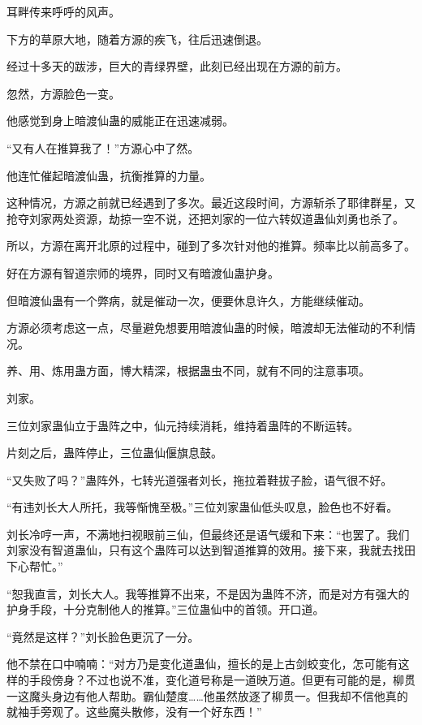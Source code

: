 
\begin{this_body}

耳畔传来呼呼的风声。

下方的草原大地，随着方源的疾飞，往后迅速倒退。

经过十多天的跋涉，巨大的青绿界壁，此刻已经出现在方源的前方。

忽然，方源脸色一变。

他感觉到身上暗渡仙蛊的威能正在迅速减弱。

“又有人在推算我了！”方源心中了然。

他连忙催起暗渡仙蛊，抗衡推算的力量。

这种情况，方源之前就已经遇到了多次。最近这段时间，方源斩杀了耶律群星，又抢夺刘家两处资源，劫掠一空不说，还把刘家的一位六转奴道蛊仙刘勇也杀了。

所以，方源在离开北原的过程中，碰到了多次针对他的推算。频率比以前高多了。

好在方源有智道宗师的境界，同时又有暗渡仙蛊护身。

但暗渡仙蛊有一个弊病，就是催动一次，便要休息许久，方能继续催动。

方源必须考虑这一点，尽量避免想要用暗渡仙蛊的时候，暗渡却无法催动的不利情况。

养、用、炼用蛊方面，博大精深，根据蛊虫不同，就有不同的注意事项。

刘家。

三位刘家蛊仙立于蛊阵之中，仙元持续消耗，维持着蛊阵的不断运转。

片刻之后，蛊阵停止，三位蛊仙偃旗息鼓。

“又失败了吗？”蛊阵外，七转光道强者刘长，拖拉着鞋拔子脸，语气很不好。

“有违刘长大人所托，我等惭愧至极。”三位刘家蛊仙低头叹息，脸色也不好看。

刘长冷哼一声，不满地扫视眼前三仙，但最终还是语气缓和下来：“也罢了。我们刘家没有智道蛊仙，只有这个蛊阵可以达到智道推算的效用。接下来，我就去找田下心帮忙。”

“恕我直言，刘长大人。我等推算不出来，不是因为蛊阵不济，而是对方有强大的护身手段，十分克制他人的推算。”三位蛊仙中的首领。开口道。

“竟然是这样？”刘长脸色更沉了一分。

他不禁在口中喃喃：“对方乃是变化道蛊仙，擅长的是上古剑蛟变化，怎可能有这样的手段傍身？不过也说不准，变化道号称是一道映万道。但更有可能的是，柳贯一这魔头身边有他人帮助。霸仙楚度……他虽然放逐了柳贯一。但我却不信他真的就袖手旁观了。这些魔头散修，没有一个好东西！”


\end{this_body}
